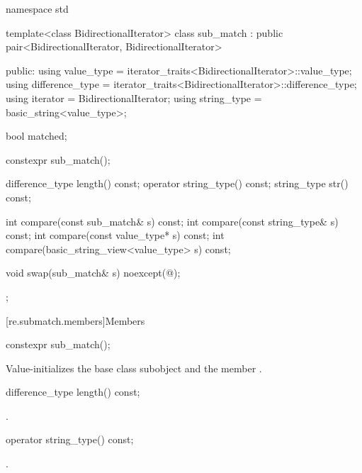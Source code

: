 \begin{codeblock}
namespace std {
  template<class BidirectionalIterator>
  class sub_match : public pair<BidirectionalIterator, BidirectionalIterator> {
  public:
    using value_type      = iterator_traits<BidirectionalIterator>::value_type;
    using difference_type = iterator_traits<BidirectionalIterator>::difference_type;
    using iterator        = BidirectionalIterator;
    using string_type     = basic_string<value_type>;

    bool matched;

    constexpr sub_match();

    difference_type length() const;
    operator string_type() const;
    string_type str() const;

    int compare(const sub_match& s) const;
    int compare(const string_type& s) const;
    int compare(const value_type* s) const;
    int compare(basic_string_view<value_type> s) const;

    void swap(sub_match& s) noexcept(@\seebelow@);
  };
}
\end{codeblock}


[re.submatch.members]{Members}

%
\begin{itemdecl}
constexpr sub_match();
\end{itemdecl}

\begin{itemdescr}
\pnum
\effects
Value-initializes the  base class subobject and the member
.
\end{itemdescr}

%
\begin{itemdecl}
difference_type length() const;
\end{itemdecl}

\begin{itemdescr}
\pnum
\returns
{}.
\end{itemdescr}

%
\begin{itemdecl}
operator string_type() const;
\end{itemdecl}

\begin{itemdescr}
\pnum
\returns
{}.
\end{itemdescr}

